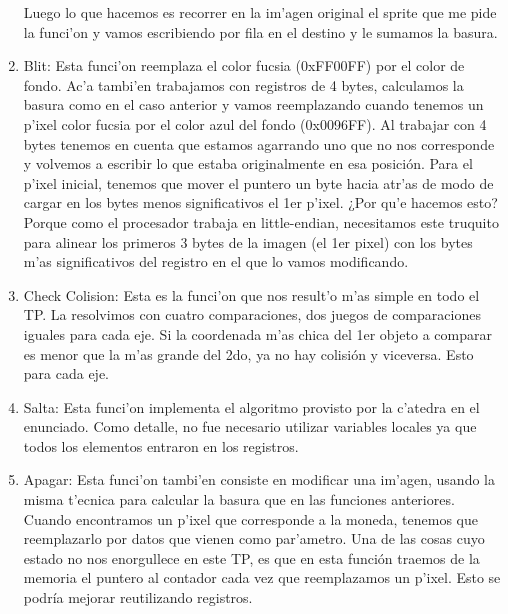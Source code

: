\begin{enumerate}
Luego lo que hacemos es recorrer en la im'agen original el sprite que me pide la funci'on y vamos escribiendo por fila en el destino y le sumamos la basura.
\item Blit:
Esta funci'on reemplaza el color fucsia (0xFF00FF) por el color de fondo.  Ac'a tambi'en trabajamos con registros de 4 bytes, calculamos la basura como en el caso anterior y vamos reemplazando cuando tenemos un p'ixel color fucsia por el color azul del fondo (0x0096FF).  Al trabajar con 4 bytes tenemos en cuenta que estamos agarrando uno que no nos corresponde y volvemos a escribir lo que estaba originalmente en esa posición.  Para el p'ixel inicial, tenemos que mover el puntero un byte hacia atr'as de modo de cargar en los bytes menos significativos el 1er p'ixel.  ¿Por qu'e hacemos esto?  Porque como el procesador trabaja en little-endian, necesitamos este truquito para alinear los primeros 3 bytes de la imagen (el 1er pixel) con los bytes m'as significativos del registro en el que lo vamos modificando.
\item Check Colision:
Esta es la funci'on que nos result'o m'as simple en todo el TP.  La resolvimos con cuatro comparaciones, dos juegos de comparaciones iguales para cada eje.  Si la coordenada m'as chica del 1er objeto a comparar es menor que la m'as grande del 2do, ya no hay colisión y viceversa.  Esto para cada eje.
\item Salta:
Esta funci'on implementa el algoritmo provisto por la c'atedra en el enunciado.  Como detalle, no fue necesario utilizar variables locales ya que todos los elementos entraron en los registros.
\item Apagar:
Esta funci'on tambi'en consiste en modificar una im'agen, usando la misma t'ecnica para calcular la basura que en las funciones anteriores.  Cuando encontramos un p'ixel que corresponde a la moneda, tenemos que reemplazarlo por datos que vienen como par'ametro.  Una de las cosas cuyo estado no nos enorgullece en este TP, es que en esta función traemos de la memoria el puntero al contador cada vez que reemplazamos un p'ixel.  Esto se podría mejorar reutilizando registros.
\end{enumerate}



